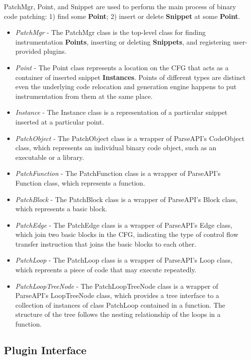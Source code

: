 PatchMgr, Point, and Snippet are used to perform the main process of binary code
patching: 1) find some \textbf{Point}; 2) insert or delete \textbf{Snippet} at some \textbf{Point}.
\begin{itemize}
\item \emph{PatchMgr} - The PatchMgr class is the top-level class for finding
    instrumentation \textbf{Points}, inserting or deleting \textbf{Snippets}, and registering
    user-provided plugins.
\item \emph{Point} - The Point class represents a location on the CFG that acts as a
    container of inserted snippet \textbf{Instances}. Points of different types are
    distinct even the underlying code relocation and generation engine happens
    to put instrumentation from them at the same place.
\item \emph{Instance} - The Instance class is a representation of a particular snippet
    inserted at a particular point.
\item \emph{PatchObject} - The PatchObject class is a wrapper of ParseAPI's CodeObject
    class, which represents an individual binary code object, such as an
    executable or a library.
\item \emph{PatchFunction} - The PatchFunction class is a wrapper of ParseAPI's
    Function class, which represents a function.
\item \emph{PatchBlock} - The PatchBlock class is a wrapper of ParseAPI's Block class,
    which represents a basic block.
\item \emph{PatchEdge} - The PatchEdge class is a wrapper of ParseAPI's Edge class,
    which join two basic blocks in the CFG, indicating the type of control flow
    transfer instruction that joins the basic blocks to each other.
\item \emph{PatchLoop} - The PatchLoop class is a wrapper of ParseAPI's Loop class,
    which repreents a piece of code that may execute repeatedly.
\item \emph{PatchLoopTreeNode} - The PatchLoopTreeNode class is a wrapper of ParseAPI's LoopTreeNode class,
    which provides a tree interface to a collection of instances of class PatchLoop contained in a function.
    The structure of the tree follows the nesting relationship of the loops in a function.

\end{itemize}
\subsection{Plugin Interface}
\label{sec:plugin-interface}

